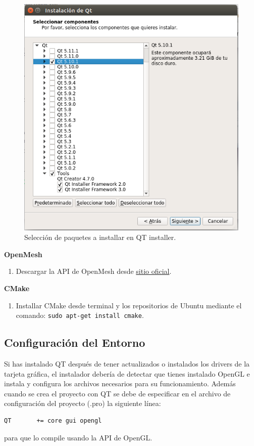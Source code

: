 \begin{figure} %
	\centering
	\includegraphics[scale=0.4]{imagenes/qt_install_1.png} 
	\caption{ Selección de paquetes a installar en QT installer.} \label{fig:qt_install_1.png}
\end{figure}

\textbf{OpenMesh}
\begin{enumerate}
	\item Descargar la API de OpenMesh desde \href{https://www.openmesh.org/download/}{sitio oficial}.
\end{enumerate} 	
	
	
\textbf{CMake}
\begin{enumerate}
	\item Installar CMake desde terminal y los repositorios de Ubuntu mediante el comando: \texttt{sudo apt-get install cmake}.
\end{enumerate} 



\subsection{ Configuración del Entorno}
Si has instalado QT después de tener actualizados o instalados los drivers de la tarjeta gráfica, el instalador debería de detectar que tienes instalado OpenGL e instala y configura los archivos necesarios para su funcionamiento. Además cuando se crea el proyecto con QT se debe de especificar en el archivo de configuración del proyecto (.pro) la siguiente línea:
\begin{lstlisting}[language=bash]
QT       += core gui opengl
\end{lstlisting}
para que lo compile usando la API de OpenGL.\\

